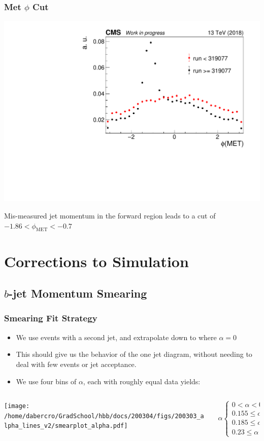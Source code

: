 \documentclass{beamer}
\begin{document}
\begin{frame}
  \frametitle{Met $\phi$ Cut}

  \begin{center}
    \includegraphics[width=0.7\linewidth]{figures/METPhi319077.pdf}
  \end{center}
  
  Mis-measured jet momentum in the forward region leads to a cut of
  $-1.86 < \phi_\mathrm{MET} < -0.7$

\end{frame}

\section{Corrections to Simulation}

\subsection{$b$-jet Momentum Smearing}

\begin{frame}
  \frametitle{Smearing Fit Strategy}

  \begin{itemize}
  \item We use events with a second jet, and extrapolate down to where $\alpha = 0$
  \item This should give us the behavior of the one jet diagram,
    without needing to deal with few events or jet acceptance.
  \item We use four bins of $\alpha$, each with roughly equal data yields:
  \end{itemize}
  \begin{columns}
    \begin{column}{0.5\linewidth}
      \texttt{[image: /home/dabercro/GradSchool/hbb/docs/200304/figs/200303\_alpha\_lines\_v2/smearplot\_alpha.pdf]}
    \end{column}
    \begin{column}{0.5\linewidth}
      \[
      \alpha
      \begin{cases}
        0 < \alpha < 0.155 \\
        0.155 \le \alpha < 0.185 \\
        0.185 \le \alpha < 0.23 \\
        0.23 \le \alpha < 0.3
      \end{cases}
      \]
    \end{column}
  \end{columns}

\end{frame}
\end{document}

